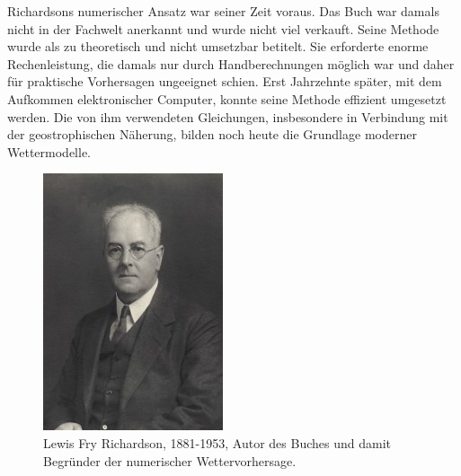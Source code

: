 Richardsons numerischer Ansatz war seiner Zeit voraus.
Das Buch war damals nicht in der Fachwelt anerkannt und wurde nicht viel verkauft. 
Seine Methode wurde als zu theoretisch und nicht umsetzbar betitelt. 
Sie erforderte enorme Rechenleistung, die damals nur durch Handberechnungen möglich war und daher für praktische Vorhersagen ungeeignet schien.  
Erst Jahrzehnte später, mit dem Aufkommen elektronischer Computer, konnte seine Methode effizient umgesetzt werden.  
Die von ihm verwendeten Gleichungen, insbesondere in Verbindung mit der geostrophischen Näherung, bilden noch heute die Grundlage moderner Wettermodelle.

\begin{figure}[h]
	\centering
	\includegraphics{Portrait_Richardson.jpg}
	\caption{Lewis Fry Richardson, 1881-1953, Autor des Buches \cite{geostrophisch:wpbnp} und damit Begründer der numerischer Wettervorhersage.}
	\label{bild:portraitRichi}
\end{figure}







